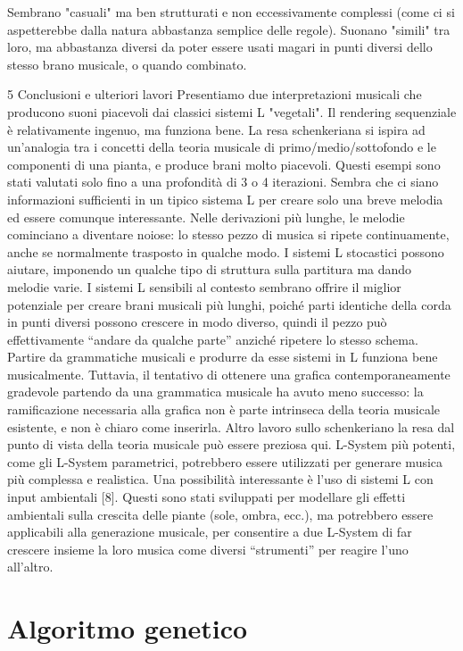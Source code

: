 \documentclass[a4paper,12pt]{report}
\begin{document}
Sembrano "casuali" ma ben strutturati e non eccessivamente complessi (come ci si aspetterebbe dalla natura abbastanza semplice delle regole). 
Suonano "simili" tra loro, ma abbastanza diversi da poter essere usati magari in punti diversi dello stesso brano musicale, o quando combinato.

5 Conclusioni e ulteriori lavori
Presentiamo due interpretazioni musicali che producono suoni piacevoli dai classici sistemi L "vegetali". 
Il rendering sequenziale è relativamente ingenuo, ma funziona bene. 
La resa schenkeriana si ispira ad un'analogia tra i concetti della teoria musicale di primo/medio/sottofondo e le componenti di una pianta, e produce brani molto piacevoli.
Questi esempi sono stati valutati solo fino a una profondità di 3 o 4 iterazioni. 
Sembra che ci siano informazioni sufficienti in un tipico sistema L per creare solo una breve melodia ed essere comunque interessante. 
Nelle derivazioni più lunghe, le melodie cominciano a diventare noiose: lo stesso pezzo di musica si ripete continuamente, anche se normalmente trasposto in qualche modo. 
I sistemi L stocastici possono aiutare, imponendo un qualche tipo di struttura sulla partitura ma dando melodie varie. 
I sistemi L sensibili al contesto sembrano offrire il miglior potenziale per creare brani musicali più lunghi, poiché parti identiche della corda in punti diversi possono crescere in modo diverso, quindi il pezzo può effettivamente “andare da qualche parte” anziché ripetere lo stesso schema.
Partire da grammatiche musicali e produrre da esse sistemi in L funziona bene musicalmente. 
Tuttavia, il tentativo di ottenere una grafica contemporaneamente gradevole partendo da una grammatica musicale ha avuto meno successo: la ramificazione necessaria alla grafica non è parte intrinseca della teoria musicale esistente, e non è chiaro come inserirla. Altro lavoro sullo schenkeriano la resa dal punto di vista della teoria musicale può essere preziosa qui.
L-System più potenti, come gli L-System parametrici, potrebbero essere utilizzati per generare musica più complessa e realistica. Una possibilità interessante è l'uso di sistemi L con input ambientali [8]. 
Questi sono stati sviluppati per modellare gli effetti ambientali sulla crescita delle piante (sole, ombra, ecc.), ma potrebbero essere applicabili alla generazione musicale, per consentire a due L-System di far crescere insieme la loro musica come diversi “strumenti” per reagire l’uno all’altro.

\chapter{Algoritmo genetico}
\end{document}
